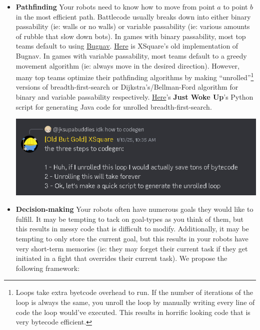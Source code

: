 \begin{enumerate}
\begin{itemize}
      \item \textbf{Pathfinding} Your robots need to know how to move from point $a$ to point $b$ in the most efficient path. Battlecode usually breaks down into either binary passability (ie: walls or no walls) or variable passability (ie: various amounts of rubble that slow down bots). In games with binary passability, most top teams default to using \href{https://www.cs.cmu.edu/~motionplanning/lecture/Chap2-Bug-Alg_howie.pdf}{Bugnav}. \href{https://github.com/IvanGeffner/BTC24/blob/master/BugPath.java}{Here} is XSquare's old implementation of Bugnav. In games with variable passability, most teams default to a greedy movement algorithm (ie: always move in the desired direction). However, many top teams optimize their pathfinding algorithms by making ``unrolled''\footnote{Loops take extra byetcode overhead to run. If the number of iterations of the loop is always the same, you unroll the loop by manually writing every line of code the loop would've executed. This results in horrific looking code that is very bytecode efficient.} versions of breadth-first-search or Dijkstra's/Bellman-Ford algorithm for binary and variable passability respectively. \href{https://github.com/Tim-gubski/BattleCode2025/blob/main/scripts/pathfind.py}{Here}'s \textbf{Just Woke Up}'s Python script for generating Java code for unrolled breadth-first-search.
      \begin{center}
          \includegraphics[scale=0.5]{images/unroll.png}
      \end{center}
      \item \textbf{Decision-making} Your robots often have numerous goals they would like to fulfill. It may be tempting to tack on goal-types as you think of them, but this results in messy code that is difficult to modify. Additionally, it may be tempting to only store the current goal, but this results in your robots have very short-term memories (ie: they may forget their current task if they get initiated in a fight that overrides their current task). We propose the following framework:

    \medskip
      

\end{itemize}
\end{enumerate}
